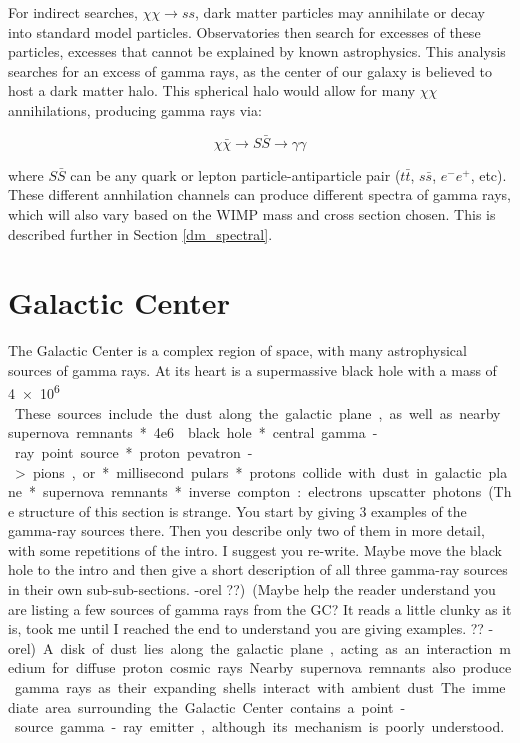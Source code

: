     For indirect searches, $\chi\chi \rightarrow ss$, dark matter particles may annihilate or decay into standard model particles.
    Observatories then search for excesses of these particles, excesses that cannot be explained by known astrophysics.
    This analysis searches for an excess of gamma rays, as the center of our galaxy is believed to host a dark matter halo.
    This spherical halo would allow for many $\chi\chi$ annihilations, producing gamma rays via: 
    
    $$\chi\bar{\chi} \rightarrow S\bar{S} \rightarrow \gamma\gamma$$

    where $S\bar{S}$ can be any quark or lepton particle-antiparticle pair ($t\bar{t}$, $s\bar{s}$, $e^{-}e^{+}$, etc).
    These different annhilation channels can produce different spectra of gamma rays, which will also vary based on the WIMP mass and cross section chosen.
    This is described further in Section \ref{dm_spectral}.

\FloatBarrier

\section{Galactic Center}
  
  The Galactic Center is a complex region of space, with many astrophysical sources of gamma rays.
  At its heart is a supermassive black hole with a mass of \SI{4e6}{ \Msol{} }.
  These sources include the dust along the galactic plane, as well as nearby supernova remnants.
  
  * 4e6 \Msol black hole
  * central gamma-ray point source
    * proton pevatron -> pions, or
    * millisecond pulars
  * protons collide with dust in galactic plane
  * supernova remnants
  * inverse compton: electrons upscatter photons



  {\color{red}(The structure of this section is strange. You start by giving 3 examples of the gamma-ray sources there. Then you describe only two of them in more detail, with some repetitions of the intro. I suggest you re-write. Maybe move the black hole to the intro and then give a short description of all three gamma-ray sources in their own sub-sub-sections. -orel ??)}

  {\color{red}(Maybe help the reader understand you are listing a few sources of gamma rays from the GC? It reads a little clunky as it is, took me until I reached the end to understand you are giving examples. ?? -orel)}
  A disk of dust lies along the galactic plane, acting as an interaction medium for diffuse proton cosmic rays.
  Nearby supernova remnants also produce gamma rays as their expanding shells interact with ambient dust.
  The immediate area surrounding the Galactic Center contains a point-source gamma-ray emitter, although its mechanism is poorly understood.


